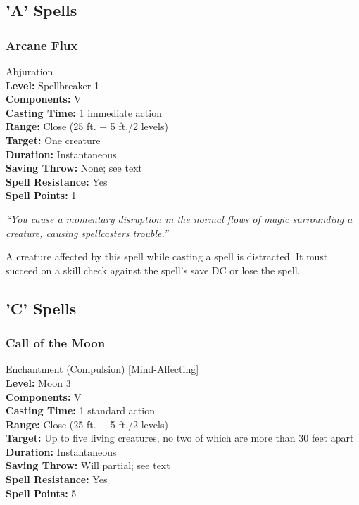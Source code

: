 \subsection{'A' Spells}
\subsubsection{Arcane Flux}
\label{Spell:ArcaneFlux}
Abjuration
\\ \textbf{Level:} Spellbreaker 1
\\ \textbf{Components:} V
\\ \textbf{Casting Time:} 1 immediate action
\\ \textbf{Range:} Close (25 ft. + 5 ft./2 levels)
\\ \textbf{Target:} One creature
\\ \textbf{Duration:} Instantaneous
\\ \textbf{Saving Throw:} None; see text
\\ \textbf{Spell Resistance:} Yes
\\ \textbf{Spell Points:} 1

\emph{``You cause a momentary disruption in the normal flows of magic surrounding a creature, causing spellcasters trouble.''}

A creature affected by this spell while casting a spell is distracted. It must succeed on a  skill check against the spell's save DC or lose the spell.
\subsection{'C' Spells}
\subsubsection{Call of the Moon}
\label{Spell:CallOfTheMoon}
Enchantment (Compulsion) [Mind-Affecting]
\\ \textbf{Level:} Moon 3
\\ \textbf{Components:} V
\\ \textbf{Casting Time:} 1 standard action
\\ \textbf{Range:} Close (25 ft. + 5 ft./2 levels)
\\ \textbf{Target:} Up to five living creatures, no two of which are more than 30 feet apart
\\ \textbf{Duration:} Instantaneous
\\ \textbf{Saving Throw:} Will partial; see text
\\ \textbf{Spell Resistance:} Yes
\\ \textbf{Spell Points:} 5

